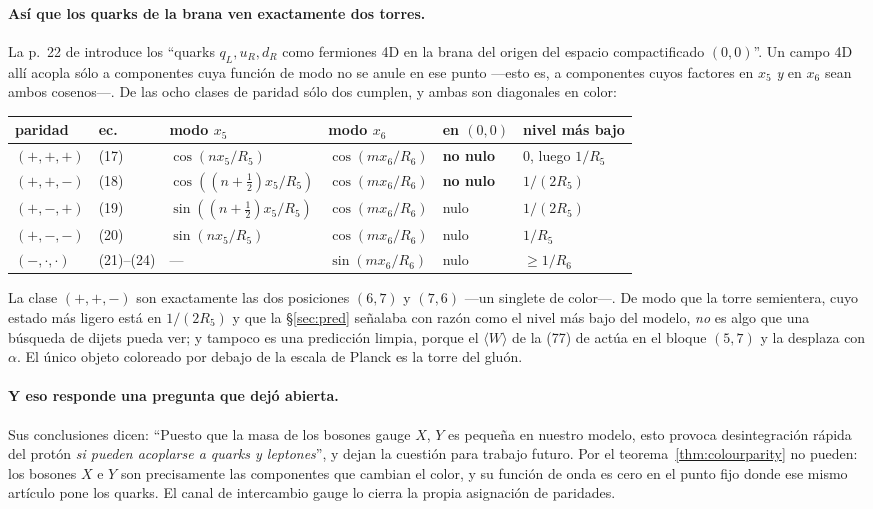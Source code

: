 \documentclass[11pt,a4paper]{article}
\begin{document}
\paragraph{Así que los quarks de la brana ven exactamente dos torres.} La p.~22 de \cite{KM25}
introduce los ``quarks $q_L,u_R,d_R$ como fermiones 4D en la brana del origen del espacio
compactificado $(0,0)$''. Un campo 4D allí acopla sólo a componentes cuya función de modo no se anule en ese
punto ---esto es, a componentes cuyos factores en $x_5$ \emph{y} en $x_6$ sean ambos cosenos---. De
las ocho clases de paridad sólo dos cumplen, y ambas son diagonales en color:

\begin{center}\small
{}
\begin{tabular}{llllll}
\toprule
\rowcolor{hdrblue!10} paridad & ec. & modo $x_5$ & modo $x_6$ & en $(0,0)$ & nivel más bajo\\
\midrule
$(+,+,+)$ & (17) & $\cos(nx_5/R_5)$ & $\cos(mx_6/R_6)$ & \textbf{no nulo} & $0$, luego $1/R_5$\\
$(+,+,-)$ & (18) & $\cos((n{+}\tfrac12)x_5/R_5)$ & $\cos(mx_6/R_6)$ & \textbf{no nulo} & $1/(2R_5)$\\
$(+,-,+)$ & (19) & $\sin((n{+}\tfrac12)x_5/R_5)$ & $\cos(mx_6/R_6)$ & nulo & $1/(2R_5)$\\
$(+,-,-)$ & (20) & $\sin(nx_5/R_5)$ & $\cos(mx_6/R_6)$ & nulo & $1/R_5$\\
$(-,\cdot,\cdot)$ & (21)--(24) & --- & $\sin(mx_6/R_6)$ & nulo & $\ge 1/R_6$\\
\bottomrule
\end{tabular}
\end{center}

\noindent La clase $(+,+,-)$ son exactamente las dos posiciones $(6,7)$ y $(7,6)$ ---un singlete de
color---. De modo que la torre semientera, cuyo estado más ligero está en $1/(2R_5)$ y que la
\S\ref{sec:pred} señalaba con razón como el nivel más bajo del modelo, \emph{no} es algo que una
búsqueda de dijets pueda ver; y tampoco es una predicción limpia, porque el $\langle W\rangle$ de
la (77) de \cite{KM25} actúa en el bloque $(5,7)$ y la desplaza con $\alpha$. El único objeto
coloreado por debajo de la escala de Planck es la torre del gluón.

\paragraph{Y eso responde una pregunta que \cite{KM25} dejó abierta.} Sus conclusiones dicen:
``Puesto que la masa de los bosones gauge $X$, $Y$ es pequeña en nuestro modelo, esto provoca
desintegración rápida del protón \emph{si pueden acoplarse a quarks y leptones}'', y dejan la cuestión para trabajo futuro. Por el
teorema~\ref{thm:colourparity} no pueden: los bosones $X$ e $Y$ son precisamente las componentes
que cambian el color, y su función de onda es cero en el punto fijo donde ese mismo artículo pone
los quarks. El canal de intercambio gauge lo cierra la propia asignación de paridades.
\end{document}
